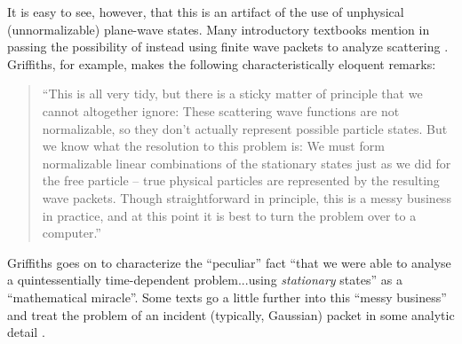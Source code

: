 \documentclass[aps,prc,onecolumn,letterpaper,floatfix,12pt]{revtex4}
\begin{document}
It is easy to see, however, that this is an artifact of the use of unphysical
(unnormalizable) plane-wave states.  Many introductory textbooks mention in
passing the possibility of instead using finite wave packets to
analyze scattering \cite{townsend}.  Griffiths, for example, makes
the following characteristically eloquent remarks:
\begin{quote}
``This is all very tidy, but there is a sticky matter of principle
that we cannot altogether ignore:  These scattering wave functions are
not normalizable, so they don't actually represent possible particle
states.  But we know what the resolution to this problem is: We must
form normalizable linear combinations of the stationary states just as
we did for the free particle -- true physical particles are
represented by the resulting wave packets.  Though straightforward in
principle, this is a messy business in practice, and at this point it
is best to turn the problem over to a computer.'' \cite{griffiths}
\end{quote}
Griffiths goes on to characterize the ``peculiar''
fact ``that we were able to analyse a quintessentially time-dependent
problem...using \emph{stationary} states'' as a ``mathematical
miracle''. 
Some texts go a little further into this ``messy business'' and treat 
the problem of an incident
(typically, Gaussian) packet in some analytic detail \cite{shankar}.
\end{document}
